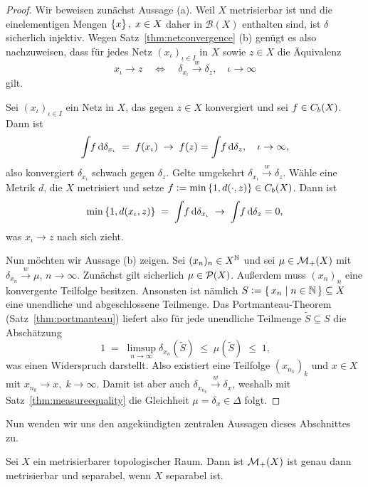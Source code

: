 \documentclass[../main/main.tex]{subfiles}
\begin{document}
	\begin{proof}
		Wir beweisen zunächst Aussage (a). Weil $X$ metrisierbar ist und die einelementigen Mengen $\left\{x\right\}, \; x \in X$ daher in $\mathcal{B}(X)$ enthalten sind, ist $\delta$ sicherlich injektiv.
		Wegen Satz~\ref{thm:netconvergence} (b) genügt es also nachzuweisen, dass für jedes Netz $(x_\iota)_{\iota \in I}$ in $X$ sowie $z \in X$ die Äquivalenz
		\[ x_\iota \to z \quad \iff \quad \delta_{x_\iota} \xrightarrow{w} \delta_z, \quad \iota \to \infty \]
		gilt. 
		
		Sei  $(x_\iota)_{\iota \in I}$ ein Netz in $X$, das gegen $z \in X$ konvergiert und sei $f \in C_b(X)$. Dann ist
		\[ \int_{} \, f \, \mathrm{d}\delta_{x_\iota} \; = \; f(x_\iota) \; \to \; f(z) = \int_{} \, f \, \mathrm{d}\delta_{z}, \quad \iota \to \infty \text{,} \]
		also konvergiert $\delta_{x_\iota}$ schwach gegen $\delta_z$. Gelte umgekehrt $\delta_{x_\iota} \xrightarrow{w} \delta_z$. Wähle eine Metrik $d$, die $X$ metrisiert und
		setze $f \vcentcolon = \min \left\{1, d(\cdot, z)\right\} \in C_b(X)$. Dann ist 
		\[ \min \left\{1, d(x_\iota, z)\right\} \; = \; \int_{} \, f \, \mathrm{d}\delta_{x_\iota} \; \to \; \int_{} \, f \, \mathrm{d}\delta_{z} = 0 \text{,} \]
		was $x_\iota \to z$ nach sich zieht.
		
		Nun möchten wir Aussage (b) zeigen. Sei $(x_n)_n \in X^{\mathbb{N}}$ und sei $\mu \in \mathcal{M}_{+}(X)$ mit $\delta_{x_n} \xrightarrow{w} \mu$, $n \to \infty$. Zunächst gilt sicherlich $\mu \in \mathcal{P}(X)$.
		Außerdem muss $(x_n)_n$ eine konvergente Teilfolge besitzen. Ansonsten ist nämlich $S \vcentcolon = \left\{\, x_n \; \middle| \; n \in \mathbb{N} \,\right\} \subseteq X$ eine unendliche und abgeschlossene Teilmenge. Das Portmanteau-Theorem (Satz~\ref{thm:portmanteau}) liefert also für jede unendliche Teilmenge $\tilde{S} \subseteq S$ die Abschätzung
		\[ 1 \; = \; \limsup_{n \to \infty} \delta_{x_n}(\tilde{S}) \; \leq \; \mu(\tilde{S}) \; \leq \; 1 \text{,} \]
		was einen Widerspruch darstellt. Also existiert eine Teilfolge $(x_{n_k})_k$ und $x \in X$ mit $x_{n_k} \to x, \; k \to \infty$. Damit ist aber auch $\delta_{x_{n_k}} \xrightarrow{w} \delta_x$, weshalb mit
		Satz~\ref{thm:measureequality} die Gleichheit $\mu = \delta_x \in \Delta$ folgt.
	\end{proof}

	Nun wenden wir uns den angekündigten zentralen Aussagen dieses Abschnittes zu. 
	
	\begin{Satz}
		\label{thm:finitemeasuresmetrizableseparable}
		Sei $X$ ein metrisierbarer topologischer Raum. Dann ist $\mathcal{M}_{+}(X)$ ist genau dann metrisierbar und separabel, wenn $X$ separabel ist.
	\end{Satz}
\end{document}
